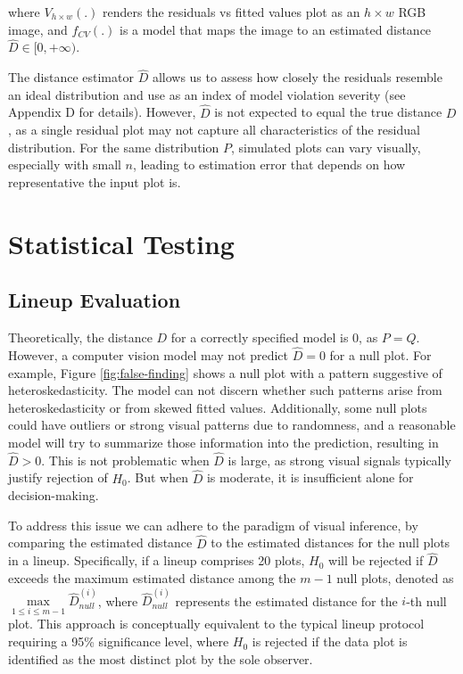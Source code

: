 \documentclass[]{interact}
\theoremstyle{plain}%
\theoremstyle{definition}
\theoremstyle{remark}
\begin{document}
\noindent where \(V_{h \times w}(.)\) renders the residuals vs fitted
values plot as an \(h \times w\) RGB image, and \(f_{CV}(.)\) is a model
that maps the image to an estimated distance
\(\hat{D} \in [0, +\infty)\).

The distance estimator \(\hat{D}\) allows us to assess how closely the
residuals resemble an ideal distribution and use as an index of model
violation severity (see Appendix D for details). However, \(\hat{D}\) is
not expected to equal the true distance \(D\), as a single residual plot
may not capture all characteristics of the residual distribution. For
the same distribution \(P\), simulated plots can vary visually,
especially with small \(n\), leading to estimation error that depends on
how representative the input plot is.

\section{Statistical Testing}\label{sec-model-statistical-testing}

\subsection{Lineup Evaluation}\label{sec-model-lineup-evaluation}

Theoretically, the distance \(D\) for a correctly specified model is
\(0\), as \(P = Q\). However, a computer vision model may not predict
\(\hat{D} = 0\) for a null plot. For example, Figure
\ref{fig:false-finding} shows a null plot with a pattern suggestive of
heteroskedasticity. The model can not discern whether such patterns
arise from heteroskedasticity or from skewed fitted values.
Additionally, some null plots could have outliers or strong visual
patterns due to randomness, and a reasonable model will try to summarize
those information into the prediction, resulting in \(\hat{D} > 0\).
This is not problematic when \(\hat{D}\) is large, as strong visual
signals typically justify rejection of \(H_0\). But when \(\hat{D}\) is
moderate, it is insufficient alone for decision-making.

To address this issue we can adhere to the paradigm of visual inference,
by comparing the estimated distance \(\hat{D}\) to the estimated
distances for the null plots in a lineup. Specifically, if a lineup
comprises 20 plots, \(H_0\) will be rejected if \(\hat{D}\) exceeds the
maximum estimated distance among the \(m - 1\) null plots, denoted as
\(\max\limits_{1 \leq i \leq m-1} {\hat{D}_{null}^{(i)}}\), where
\(\hat{D}_{null}^{(i)}\) represents the estimated distance for the
\(i\)-th null plot. This approach is conceptually equivalent to the
typical lineup protocol requiring a 95\% significance level, where
\(H_0\) is rejected if the data plot is identified as the most distinct
plot by the sole observer.
\end{document}
